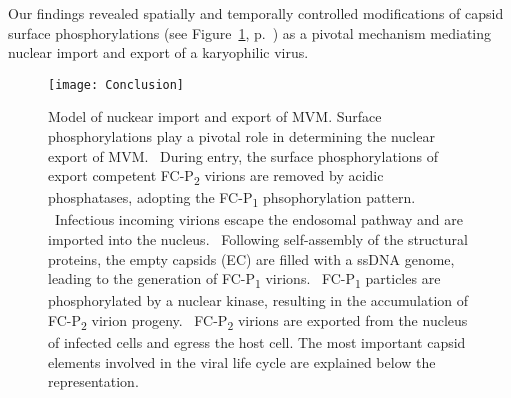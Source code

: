 \par
\medskip
Our findings revealed spatially and temporally controlled modifications of capsid surface phosphorylations (see Figure~\ref{Scheme}, p.~\pageref{Scheme}) as a pivotal mechanism mediating nuclear import and export of a karyophilic virus. 






\begin{figure}[H]
\centering
  \texttt{[image: Conclusion]}\\[0.2cm]
  \caption[Model of Nuclear Import and Export of MVM]
   {Model of nuckear import and export of MVM. Surface phosphorylations play a pivotal role in determining the nuclear export of MVM. \textbf{}~During entry, the surface phosphorylations of export competent FC-P\textsubscript{2} virions are removed by acidic phosphatases, adopting the FC-P\textsubscript{1} phsophorylation pattern. \textbf{}~Infectious incoming virions escape the endosomal pathway and are imported into the nucleus. \textbf{}~Following self-assembly of the structural proteins, the empty capsids (EC) are filled with a ssDNA genome, leading to the generation of FC-P\textsubscript{1} virions. \textbf{}~FC-P\textsubscript{1} particles are phosphorylated by a nuclear kinase, resulting in the accumulation of FC-P\textsubscript{2} virion progeny. \textbf{}~FC-P\textsubscript{2} virions are exported from the nucleus of infected cells and egress the host cell. The most important capsid elements involved in the viral life cycle are explained below the representation.} 
\label{Scheme}
\end{figure}















